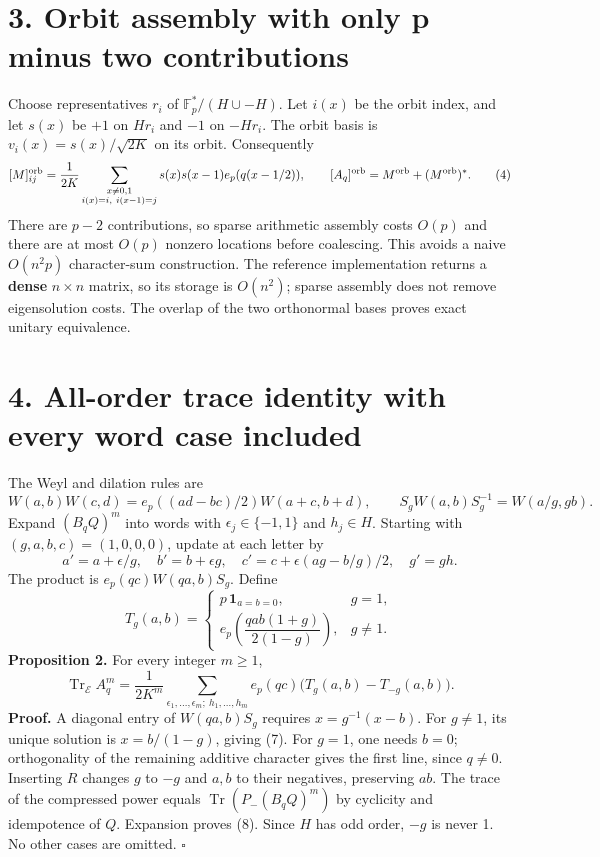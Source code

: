 \documentclass[
  11pt,
]{article}
\begin{document}
\hypertarget{orbit-assembly-with-only-p-minus-two-contributions}{%
\section{3. Orbit assembly with only p minus two
contributions}\label{orbit-assembly-with-only-p-minus-two-contributions}}

Choose representatives \(r_i\) of \(\mathbb F_p^*/(H\cup-H)\). Let
\(i(x)\) be the orbit index, and let \(s(x)\) be \(+1\) on \(Hr_i\) and
\(-1\) on \(-Hr_i\). The orbit basis is \(v_i(x)=s(x)/\sqrt{2K}\) on its
orbit. Consequently \[
 [M]^{\rm orb}_{ij}=\frac1{2K}
 \sum_{\substack{x\ne0,1\\i(x)=i,\ i(x-1)=j}}
 s(x)s(x-1)e_p(q(x-1/2)),\qquad
 [A_q]^{\rm orb}=M^{\rm orb}+(M^{\rm orb})^*. \tag{4}
\] There are \(p-2\) contributions, so sparse arithmetic assembly costs
\(O(p)\) and there are at most \(O(p)\) nonzero locations before
coalescing. This avoids a naive \(O(n^2p)\) character-sum construction.
The reference implementation returns a \textbf{dense} \(n\times n\)
matrix, so its storage is \(O(n^2)\); sparse assembly does not remove
eigensolution costs. The overlap of the two orthonormal bases proves
exact unitary equivalence.

\hypertarget{all-order-trace-identity-with-every-word-case-included}{%
\section{4. All-order trace identity with every word case
included}\label{all-order-trace-identity-with-every-word-case-included}}

The Weyl and dilation rules are \[
 W(a,b)W(c,d)=e_p((ad-bc)/2)W(a+c,b+d),\qquad
 S_gW(a,b)S_g^{-1}=W(a/g,gb). \tag{5}
\] Expand \((B_qQ)^m\) into words with \(\epsilon_j\in\{-1,1\}\) and
\(h_j\in H\). Starting with \((g,a,b,c)=(1,0,0,0)\), update at each
letter by \[
 a'=a+\epsilon/g,\quad b'=b+\epsilon g,\quad
 c'=c+\epsilon(ag-b/g)/2,\quad g'=gh. \tag{6}
\] The product is \(e_p(qc)W(qa,b)S_g\). Define \[
 T_g(a,b)=
 \begin{cases}
 p\,\mathbf1_{a=b=0},&g=1,\\
 e_p\!\left(\dfrac{qab(1+g)}{2(1-g)}\right),&g\ne1.
 \end{cases} \tag{7}
\] \textbf{Proposition 2.} For every integer \(m\geq1\), \[
 \operatorname{Tr}_{\mathcal E}A_q^m
 =\frac1{2K^m}\sum_{\epsilon_1,\ldots,\epsilon_m;\ h_1,\ldots,h_m}
   e_p(qc)\bigl(T_g(a,b)-T_{-g}(a,b)\bigr). \tag{8}
\] \textbf{Proof.} A diagonal entry of \(W(qa,b)S_g\) requires
\(x=g^{-1}(x-b)\). For \(g\ne1\), its unique solution is \(x=b/(1-g)\),
giving (7). For \(g=1\), one needs \(b=0\); orthogonality of the
remaining additive character gives the first line, since \(q\ne0\).
Inserting \(R\) changes \(g\) to \(-g\) and \(a,b\) to their negatives,
preserving \(ab\). The trace of the compressed power equals
\(\operatorname{Tr}(P_-(B_qQ)^m)\) by cyclicity and idempotence of
\(Q\). Expansion proves (8). Since \(H\) has odd order, \(-g\) is never
1. No other cases are omitted. \(\square\)
\end{document}
